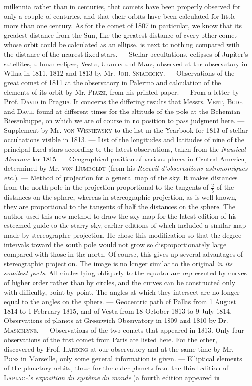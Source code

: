 millennia rather than in centuries, that comets have been properly observed for only a couple of centuries, and that their orbits have been calculated for little more than one century. As for the comet of 1807 in particular, we know that its greatest distance from the Sun, like the greatest distance of every other comet whose orbit could be calculated as an ellipse, is next to nothing compared with the distance of the nearest fixed stars. — Stellar occultations, eclipses of Jupiter's satellites, a lunar eclipse, Vesta, Uranus and Mars, observed at the observatory in Wilna in 1811, 1812 and 1813 by Mr. \textsc{Joh. Sniadecky}. — Observations of the great comet of 1811 at the observatory in Palermo and calculation of the elements of its orbit by Mr. \textsc{Piazzi}, from his printed paper. — From a letter by Prof. \textsc{David} in Prague. It concerns the differing results that Messrs. \textsc{Vent}, \textsc{Bode} and \textsc{David} found at different times for the altitude of the pole at the Bohemian Riesenkuppe, on which we are of course in no position to pass judgment here. — Supplement by Mr. \textsc{von Wisniewsky} to the list in the Yearbook for 1813 of stellar occultations visible in 1813. — List of the longitudes and latitudes of nine of the principal fixed stars according to the latest observations, taken from the \emph{Nautical Almanac} for 1815. — Geographical position of various places in Central America, determined by Mr. \textsc{von Humboldt} (from his \emph{Recueil d'observations astronomiques etc.}). — Method of projection for a general map of the sky. It makes distances from the north pole in the projection proportional to the tangents of $\frac{2}{5}$ of the distances on the sphere, whereas in stereographic projection, as is well known, they are proportional to the tangents of half the distances on the sphere. The author used this new method to draw the sky map for the latest edition of his esteemed guide to the starry sky, earlier editions of which included a similar map made by stereographic projection. He chose this modification so that the degree intervals toward the south pole would not grow so disproportionately large compared with those in the north. Of course, this gives up several advantages of stereographic projection. The image is no longer similar to the original \emph{in its smallest parts}. All circles lying obliquely to the equator are represented by curves of higher order rather than by circles, and the curves can be constructed only with difficulty, point by point. The angles at which they intersect are no longer equal to the angles on the sphere. — Geocentric path of Pallas from 1 August 1814 to 1 February 1815, and of Vesta from 18 October 1813 to 9 July 1814. — Observations of planets at Greenwich Observatory in 1809 and 1810 by Dr. \textsc{Maskelyne}. — Observations of the two comets that appeared in 1813. Only four observations of the first comet from Paris are listed here. For the other, discovered by Prof. \textsc{Harding} at our observatory and at the same time by Mr. \textsc{Pons} in Marseille, only some general information is given. — Elliptical elements of the planetary orbits, those for the older planets from the third edition of \textsc{Laplace}'s \emph{exposition du système du monde} (a fourth edition appeared in 